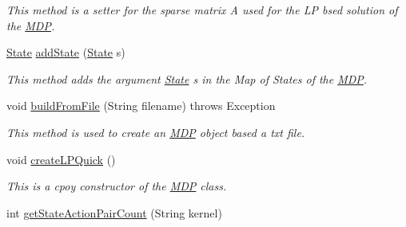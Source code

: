 \begin{DoxyCompactItemize}
\begin{DoxyCompactList}\small\item\em This method is a setter for the sparse matrix A used for the L\+P bsed solution of the \hyperlink{classese_1_1seas_1_1upenn_1_1edu_1_1_m_d_p}{M\+D\+P}. \end{DoxyCompactList}\item 
\hypertarget{classese_1_1seas_1_1upenn_1_1edu_1_1_m_d_p_a483e8c4fa59984e5b653686bc4a343c4}{}\hyperlink{classese_1_1seas_1_1upenn_1_1edu_1_1_state}{State} \hyperlink{classese_1_1seas_1_1upenn_1_1edu_1_1_m_d_p_a483e8c4fa59984e5b653686bc4a343c4}{add\+State} (\hyperlink{classese_1_1seas_1_1upenn_1_1edu_1_1_state}{State} s)\label{classese_1_1seas_1_1upenn_1_1edu_1_1_m_d_p_a483e8c4fa59984e5b653686bc4a343c4}

\begin{DoxyCompactList}\small\item\em This method adds the argument \hyperlink{classese_1_1seas_1_1upenn_1_1edu_1_1_state}{State} s in the Map of States of the \hyperlink{classese_1_1seas_1_1upenn_1_1edu_1_1_m_d_p}{M\+D\+P}. \end{DoxyCompactList}\item 
void \hyperlink{classese_1_1seas_1_1upenn_1_1edu_1_1_m_d_p_ae5da8ca2a3ae73ffc832cb4626ed2ace}{build\+From\+File} (String filename)  throws Exception 	
\begin{DoxyCompactList}\small\item\em This method is used to create an \hyperlink{classese_1_1seas_1_1upenn_1_1edu_1_1_m_d_p}{M\+D\+P} object based a txt file. \end{DoxyCompactList}\item 
\hypertarget{classese_1_1seas_1_1upenn_1_1edu_1_1_m_d_p_a23631cbc791e50769e7c5dff9e61fe0c}{}void \hyperlink{classese_1_1seas_1_1upenn_1_1edu_1_1_m_d_p_a23631cbc791e50769e7c5dff9e61fe0c}{create\+L\+P\+Quick} ()\label{classese_1_1seas_1_1upenn_1_1edu_1_1_m_d_p_a23631cbc791e50769e7c5dff9e61fe0c}

\begin{DoxyCompactList}\small\item\em This is a cpoy constructor of the \hyperlink{classese_1_1seas_1_1upenn_1_1edu_1_1_m_d_p}{M\+D\+P} class. \end{DoxyCompactList}\item 
\hypertarget{classese_1_1seas_1_1upenn_1_1edu_1_1_m_d_p_a701c0f156143fddf41c41d94b6df7bb5}{}int \hyperlink{classese_1_1seas_1_1upenn_1_1edu_1_1_m_d_p_a701c0f156143fddf41c41d94b6df7bb5}{get\+State\+Action\+Pair\+Count} (String kernel)\label{classese_1_1seas_1_1upenn_1_1edu_1_1_m_d_p_a701c0f156143fddf41c41d94b6df7bb5}


\end{DoxyCompactItemize}
